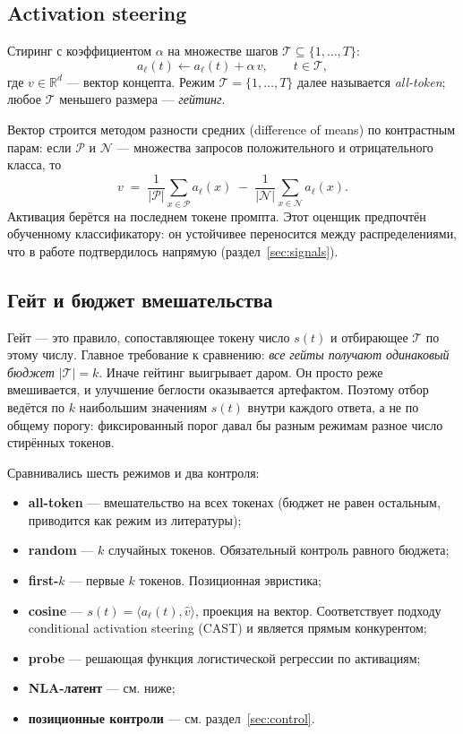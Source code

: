 \documentclass[11pt,a4paper]{article}
\begin{document}
\subsection{Activation steering}

Стиринг с коэффициентом $\alpha$ на множестве шагов $\mathcal{T}\subseteq\{1,\dots,T\}$:
\begin{equation}
a_\ell(t) \leftarrow a_\ell(t) + \alpha\,v,\qquad t\in\mathcal{T},
\label{eq:steer}
\end{equation}
где $v\in\mathbb{R}^d$ --- вектор концепта. Режим $\mathcal{T}=\{1,\dots,T\}$
далее называется \emph{all-token}; любое $\mathcal{T}$ меньшего размера ---
\emph{гейтинг}.

Вектор строится методом разности средних (difference of means) по контрастным
парам: если $\mathcal{P}$ и $\mathcal{N}$ --- множества запросов положительного
и отрицательного класса, то
\begin{equation}
v \;=\; \frac{1}{|\mathcal{P}|}\sum_{x\in\mathcal{P}} a_\ell(x)
      \;-\; \frac{1}{|\mathcal{N}|}\sum_{x\in\mathcal{N}} a_\ell(x).
\label{eq:dim}
\end{equation}
Активация берётся на последнем токене промпта. Этот оценщик предпочтён обученному
классификатору: он устойчивее переносится между распределениями, что в работе
подтвердилось напрямую (раздел~\ref{sec:signals}).

\subsection{Гейт и бюджет вмешательства}

Гейт --- это правило, сопоставляющее токену число $s(t)$ и отбирающее
$\mathcal{T}$ по этому числу. Главное требование к сравнению: \emph{все гейты получают одинаковый бюджет}
$|\mathcal{T}|=k$. Иначе гейтинг выигрывает даром. Он просто реже вмешивается,
и улучшение беглости оказывается артефактом. Поэтому отбор ведётся по $k$ наибольшим значениям $s(t)$
внутри каждого ответа, а не по общему порогу: фиксированный порог давал бы
разным режимам разное число стирённых токенов.

Сравнивались шесть режимов и два контроля:
\begin{itemize}
\item \textbf{all-token} --- вмешательство на всех токенах (бюджет не равен
      остальным, приводится как режим из литературы);
\item \textbf{random} --- $k$ случайных токенов. Обязательный контроль равного
      бюджета;
\item \textbf{first-$k$} --- первые $k$ токенов. Позиционная эвристика;
\item \textbf{cosine} --- $s(t)=\langle a_\ell(t), \hat v\rangle$, проекция на
      вектор. Соответствует подходу conditional activation steering (CAST) и
      является прямым конкурентом;
\item \textbf{probe} --- решающая функция логистической регрессии по активациям;
\item \textbf{NLA-латент} --- см. ниже;
\item \textbf{позиционные контроли} --- см. раздел~\ref{sec:control}.
\end{itemize}
\end{document}
